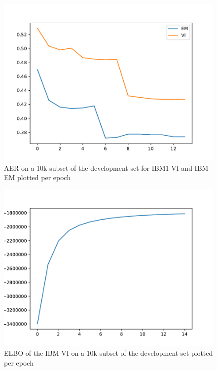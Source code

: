 \documentclass[11pt,a4paper]{article}
\begin{document}
\begin{figure}
\includegraphics[width=\linewidth]{images/VI-AERs-together.pdf}
\caption{AER on a 10k subset of the development set for IBM1-VI and IBM-EM plotted per epoch}
\label{fig:VI-AER}
\end{figure}

\begin{figure}
\includegraphics[width=\linewidth]{images/ELBOs.pdf}
\caption{ELBO of the IBM-VI on a 10k subset of the development set plotted per epoch}
\label{fig:VI-ELBO}
\end{figure}
\end{document}
